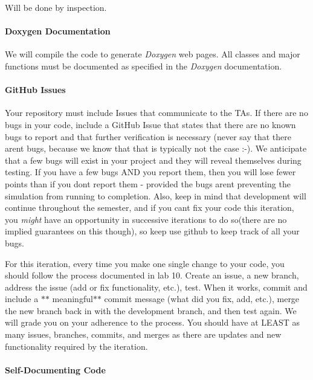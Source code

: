 Will be done by inspection.

\paragraph*{Doxygen Documentation}

We will compile the code to generate {\itshape Doxygen} web pages. All classes and major functions must be documented as specified in the {\itshape Doxygen} documentation.

\paragraph*{Git\+Hub Issues}

Your repository must include Issues that communicate to the T\+As. If there are no bugs in your code, include a Git\+Hub Issue that states that there are no known bugs to report and that further verification is necessary (never say that there aren\textquotesingle{}t bugs, because we know that that is typically not the case \+:-\/). We anticipate that a few bugs will exist in your project and they will reveal themselves during testing. If you have a few bugs A\+ND you report them, then you will lose fewer points than if you don\textquotesingle{}t report them -\/ provided the bugs aren\textquotesingle{}t preventing the simulation from running to completion. Also, keep in mind that development will continue throughout the semester, and if you can\textquotesingle{}t fix your code this iteration, you {\itshape might} have an opportunity in successive iterations to do so(there are no implied guarantees on this though), so keep use github to keep track of all your bugs.

For this iteration, every time you make one single change to your code, you should follow the process documented in lab 10. Create an issue, a new branch, address the issue (add or fix functionality, etc.), test. When it works, commit and include a $\ast$$\ast$ meaningful$\ast$$\ast$ commit message (what did you fix, add, etc.), merge the new branch back in with the development branch, and then test again. We will grade you on your adherence to the process. You should have at L\+E\+A\+ST as many issues, branches, commits, and merges as there are updates and new functionality required by the iteration.

\paragraph*{Self-\/\+Documenting Code}

